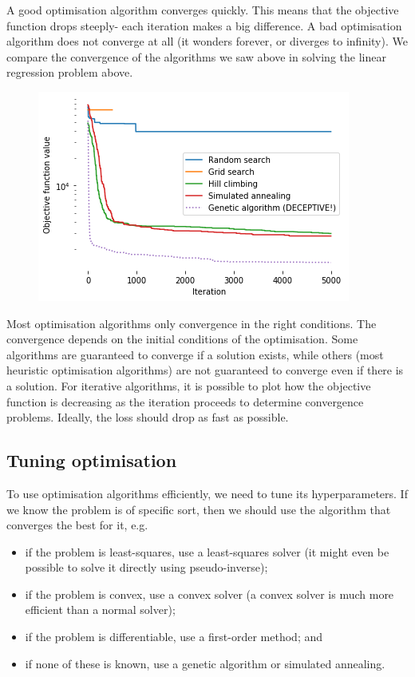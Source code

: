 \documentclass[a4paper, openany]{memoir}
\begin{document}
A good optimisation algorithm converges quickly. This means that the objective function drops steeply- each iteration makes a big difference. A bad optimisation algorithm does not converge at all (it wonders forever, or diverges to infinity). We compare the convergence of the algorithms we saw above in solving the linear regression problem above.
\begin{figure}[H]
    \centering
    \includegraphics[scale=0.6]{src/4.21 search comparisons.png}
\end{figure}

Most optimisation algorithms only convergence in the right conditions. The convergence depends on the initial conditions of the optimisation. Some algorithms are guaranteed to converge if a solution exists, while others (most heuristic optimisation algorithms) are not guaranteed to converge even if there is a solution. For iterative algorithms, it is possible to plot how the objective function is decreasing as the iteration proceeds to determine convergence problems. Ideally, the loss should drop as fast as possible.

\subsection{Tuning optimisation}
To use optimisation algorithms efficiently, we need to tune its hyperparameters. If we know the problem is of specific sort, then we should use the algorithm that converges the best for it, e.g.
\begin{itemize}
    \item if the problem is least-squares, use a least-squares solver (it might even be possible to solve it directly using pseudo-inverse);
    \item if the problem is convex, use a convex solver (a convex solver is much more efficient than a normal solver);
    \item if the problem is differentiable, use a first-order method; and
    \item if none of these is known, use a genetic algorithm or simulated annealing.
\end{itemize}
\end{document}
